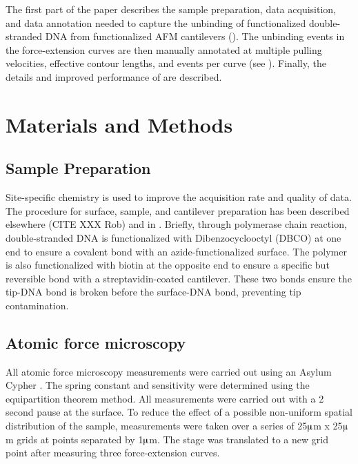  The first part of the paper describes the sample preparation, data acquisition, and data annotation needed to capture the unbinding of functionalized double-stranded DNA from functionalized AFM cantilevers ().  The unbinding events in the force-extension curves are then manually annotated at multiple pulling velocities, effective contour lengths, and events per curve (see ). Finally, the details and improved performance of \name{} are described. \pl

\section{Materials and Methods}

\subsection{Sample Preparation}

\firstp Site-specific chemistry is used to improve the acquisition rate and quality of data. The procedure for surface, sample, and cantilever preparation has been described elsewhere (CITE XXX Rob) and in . Briefly, through polymerase chain reaction, double-stranded DNA is functionalized with Dibenzocyclooctyl (DBCO) at one end to ensure a covalent bond with an azide-functionalized surface. The polymer is also functionalized with biotin at the opposite end to ensure a specific but reversible bond with a streptavidin-coated cantilever. These two bonds ensure the tip-DNA bond is broken before the surface-DNA bond, preventing tip contamination. \pl

\subsection{Atomic force microscopy}

\firstp All atomic force microscopy measurements were carried out using an Asylum Cypher . The spring constant and sensitivity were determined using the equipartition theorem method. All measurements were carried out with a 2 second pause at the surface. To reduce the effect of a possible non-uniform spatial distribution of the sample, measurements were taken over a series of 25$\muup$m x 25$\muup$m grids at points separated by 1$\muup$m. The stage was translated to a new grid point after measuring three force-extension curves. \pl

